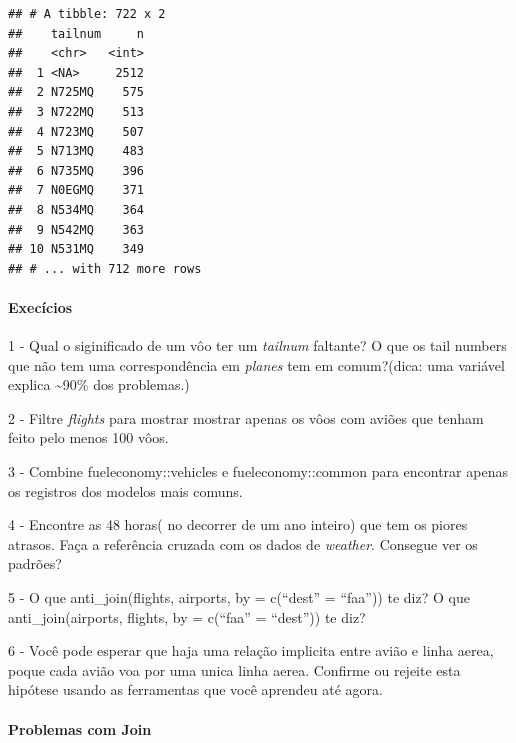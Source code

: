 \documentclass[
]{article}
\newenvironment{Shaded}{\begin{snugshade}}{\end{snugshade}}
\newcommand{\DataTypeTok}[1]{\textcolor[rgb]{0.13,0.29,0.53}{#1}}
\newcommand{\KeywordTok}[1]{\textcolor[rgb]{0.13,0.29,0.53}{\textbf{#1}}}
\newcommand{\NormalTok}[1]{#1}
\newcommand{\OperatorTok}[1]{\textcolor[rgb]{0.81,0.36,0.00}{\textbf{#1}}}
\newcommand{\OtherTok}[1]{\textcolor[rgb]{0.56,0.35,0.01}{#1}}
\newcommand{\StringTok}[1]{\textcolor[rgb]{0.31,0.60,0.02}{#1}}
\begin{document}
\begin{Shaded}
\end{Shaded}

\begin{verbatim}
## # A tibble: 722 x 2
##    tailnum     n
##    <chr>   <int>
##  1 <NA>     2512
##  2 N725MQ    575
##  3 N722MQ    513
##  4 N723MQ    507
##  5 N713MQ    483
##  6 N735MQ    396
##  7 N0EGMQ    371
##  8 N534MQ    364
##  9 N542MQ    363
## 10 N531MQ    349
## # ... with 712 more rows
\end{verbatim}

\hypertarget{execuxedcios}{%
\paragraph{Execícios}\label{execuxedcios}}

1 - Qual o siginificado de um vôo ter um \emph{tailnum} faltante? O que
os tail numbers que não tem uma correspondência em \emph{planes} tem em
comum?(dica: uma variável explica \textasciitilde90\% dos problemas.)

2 - Filtre \emph{flights} para mostrar mostrar apenas os vôos com aviões
que tenham feito pelo menos 100 vôos.

3 - Combine fueleconomy::vehicles e fueleconomy::common para encontrar
apenas os registros dos modelos mais comuns.

4 - Encontre as 48 horas( no decorrer de um ano inteiro) que tem os
piores atrasos. Faça a referência cruzada com os dados de
\emph{weather}. Consegue ver os padrões?

5 - O que anti\_join(flights, airports, by = c(``dest'' = ``faa'')) te
diz? O que anti\_join(airports, flights, by = c(``faa'' = ``dest'')) te
diz?

6 - Você pode esperar que haja uma relação implicita entre avião e linha
aerea, poque cada avião voa por uma unica linha aerea. Confirme ou
rejeite esta hipótese usando as ferramentas que você aprendeu até agora.

\hypertarget{problemas-com-join}{%
\paragraph{Problemas com Join}\label{problemas-com-join}}
\end{document}
